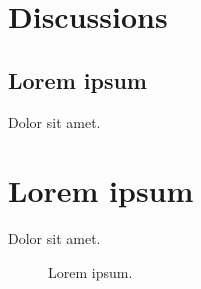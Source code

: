 \documentclass[main.tex]{subfiles}
\begin{document}
\section{Discussions}

\subsection{Lorem ipsum}

Dolor sit amet\cite{LoremIpsum2018}.

\section{Lorem ipsum}

Dolor sit amet\cite{DolorSitAmet2001}.

\begin{figure}[H]
    \centering
    \caption{Lorem ipsum.}
\end{figure}
\end{document}
